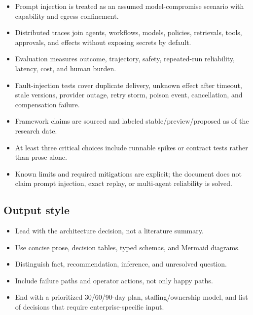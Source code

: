 \begin{itemize}
\item Prompt injection is treated as an assumed model-compromise scenario with capability and egress confinement.

\item Distributed traces join agents, workflows, models, policies, retrievals, tools, approvals, and effects without exposing secrets by default.

\item Evaluation measures outcome, trajectory, safety, repeated-run reliability, latency, cost, and human burden.

\item Fault-injection tests cover duplicate delivery, unknown effect after timeout, stale versions, provider outage, retry storm, poison event, cancellation, and compensation failure.

\item Framework claims are sourced and labeled stable/preview/proposed as of the research date.

\item At least three critical choices include runnable spikes or contract tests rather than prose alone.

\item Known limits and required mitigations are explicit; the document does not claim prompt injection, exact replay, or multi-agent reliability is solved.

\end{itemize}

\subsection{Output style}

\begin{itemize}

\item Lead with the architecture decision, not a literature summary.

\item Use concise prose, decision tables, typed schemas, and Mermaid diagrams.

\item Distinguish fact, recommendation, inference, and unresolved question.

\item Include failure paths and operator actions, not only happy paths.

\item End with a prioritized 30/60/90-day plan, staffing/ownership model, and list of decisions that require enterprise-specific input.

\end{itemize}

